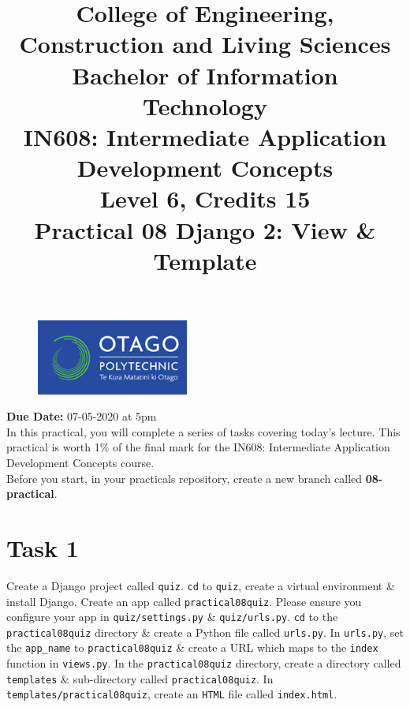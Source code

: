 \documentclass{article}
\author{}
\begin{document}
\begin{figure}
	\centering
	\includegraphics[width=50mm]{./img/logo.png}
\end{figure}

\title{College of Engineering, Construction and Living Sciences\\Bachelor of Information Technology\\IN608: Intermediate Application Development Concepts\\Level 6, Credits 15\\\textbf{Practical 08 Django 2: View \& Template}} 
\date{}
\maketitle

\textbf{Due Date:} 07-05-2020 at 5pm \\

In this practical, you will complete a series of tasks covering today's lecture. This practical is worth 1\% of the final mark for the IN608: Intermediate Application Development Concepts course. \\

Before you start, in your practicals repository, create a new branch called \textbf{08-practical}.

\section*{Task 1} 
Create a Django project called \texttt{quiz}. \texttt{cd} to \texttt{quiz}, create a virtual environment \& install Django. Create an app called \texttt{practical08quiz}. Please ensure you configure your app in \texttt{quiz/settings.py} \& \texttt{quiz/urls.py}. \texttt{cd} to the \texttt{practical08quiz} directory \& create a Python file called \texttt{urls.py}. In \texttt{urls.py}, set the \texttt{app\_name} to \texttt{practical08quiz} \& create a URL which maps to the \texttt{index} function in \texttt{views.py}. In the \texttt{practical08quiz} directory, create a directory called \texttt{templates} \& sub-directory called \texttt{practical08quiz}. In \texttt{templates/practical08quiz}, create an \texttt{HTML} file called \texttt{index.html}. \\
\end{document}
